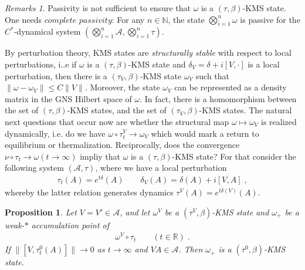\documentclass[
a4paper, %
11pt, %
onecolumn, %
openany, %
]{memoir}
\theoremstyle{definition}
\theoremstyle{remark}
\newtheorem{remarks}[definition]{Remarks}
\theoremstyle{plain}
\newtheorem{prop}[definition]{Proposition}
\begin{document}
\begin{remarks}
Passivity is not sufficient to ensure that $\omega$ is a $(\tau,\beta)$-KMS state. One needs $\textit{complete passivity}$: For any $n\in\mathbb{N}$, the state $\bigotimes
_{i=1}^n\omega$ is passive for the $C^*$-dynamical system $(\bigotimes_{i=1}^n \mathcal{A},\bigotimes_{i=1}^n\tau)$.
\end{remarks}
By perturbation theory, KMS states are \textit{structurally stable} with respect to local perturbations, i..e if $\omega$ is a $(\tau,\beta)$-KMS state and $\delta_V=\delta+i[V,\cdot]$ is a local perturbation, then there is a $(\tau_V,\beta)$-KMS state $\omega_V$ such that $\|\omega-\omega_V\|\leq C\|V\|$. Moreover, the state $\omega_V$ can be represented as a density matrix in the GNS Hilbert space of $\omega$. In fact, there is a homomorphism between the set of $(\tau,\beta)$-KMS states, and the set of $(\tau_V,\beta)$-KMS states. 
The natural next questions that occur now are whether the structural map $\omega\mapsto\omega_V$ is realized dynamically, i.e. do we have $\omega\circ\tau_t^V\rightarrow\omega_V$ which would mark a return to equilibrium or thermalization. Reciprocally, does the convergence $\nu\circ \tau_t\rightarrow\omega(t\rightarrow\infty)$ impliy that $\omega$ is a $(\tau,\beta)$-KMS state?
For that consider the following system $(\mathcal{A},\tau)$, where we have a local perturbation \begin{align}
\tau_t(A)=e^{t\delta}(A) \qquad \delta_V(A)=\delta(A)+i[V,A]\; ,
\end{align}
whereby the latter relation generates dynamics $\tau^V(A)=e^{t\delta(V)}(A)$.
\begin{prop}
Let $V=V'\in\mathcal{A}$, and let $\omega^V$ be a $(\tau^V,\beta)$-KMS state and $\omega_+$ be a weak-$*$ accumulation point of \begin{align}
\omega^V\circ \tau_t\qquad (t\in\mathbb{R})\; .
\end{align}
If $\| [V,\tau_t^0(A)]\| \rightarrow 0$ as $t\rightarrow \infty$ and $VA\in\mathcal{A}$. Then $\omega_+$ is a $(\tau^0,\beta)$-KMS state.
\end{prop}
\end{document}
